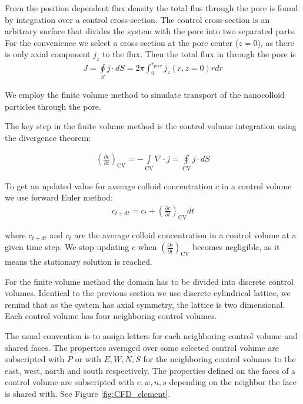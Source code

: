 \documentclass[10pt, a4paper]{article}
\begin{document}
\begin{multicols}{2}
From the position dependent flux density the total flus through the pore is found by integration over a control cross-section.
The control cross-section is an arbitrary surface that divides the system with the pore into two separated parts. 
For the convenience we select a cross-section at the pore center ($z=0$), as there is only axial component $j_z$ to the flux.
Then the total flux in through the pore is
\begin{eqnarray}
    \label{eq:total_flux_1}
    J = \oint\limits_{S} j \cdot dS = 2 \pi \int_0^{r_\textrm{pore}} j_z(r,z=0) r dr
\end{eqnarray}

We employ the finite volume method to simulate transport of the nanocolloid particles through the pore.

The key step in the finite volume method is the control volume integration using the divergence theorem:

\begin{eqnarray}
    \label{eq:CFD_integration_1}
    \left(\frac{\partial c}{\partial t}\right)_{\textrm{CV}}  = -\int\limits_{\textrm{CV}} \nabla \cdot j = \oint\limits_{\textrm{CV}} j \cdot dS
\end{eqnarray}

To get an updated value for average colloid concentration $c$ in a control volume we use forward Euler method:
\begin{eqnarray}
    c_{t+dt} = c_{t} +  \left(\frac{\partial c}{\partial t}\right)_{\textrm{CV}} dt 
\end{eqnarray}

where $c_{t+dt}$ and $c_{t}$ are the average colloid concentration in a control volume at a given time step.
We stop updating $c$ when $\left(\frac{\partial c}{\partial t}\right)_{\textrm{CV}}$ becomes negligible, as it means the stationary solution is reached.

For the finite volume method the domain has to be divided into discrete control volumes.
Identical to the previous section we use discrete cylindrical lattice, we remind that as the system has axial symmetry, the lattice is two dimensional.
Each control volume has four neighboring control volumes.

The usual convention is to assign letters for each neighboring control volume and shared faces. The properties averaged over some selected control volume are subscripted with $P$ or with $E, W, N, S$ for the neighboring control volumes to the east, west, north and south respectively. The properties defined on the faces of a control volume are subscripted with $e, w, n, s$ depending on the neighbor the face is shared with. See Figure \ref{fig:CFD_element}.


\end{multicols}
\end{document}
